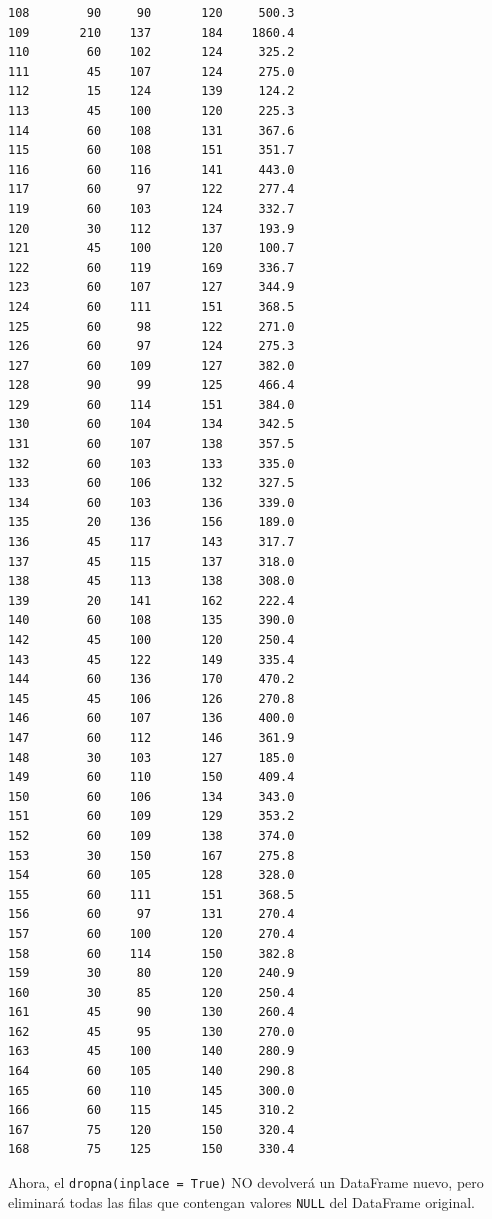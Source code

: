 \begin{code}
\begin{verbatim}
108        90     90       120     500.3
109       210    137       184    1860.4
110        60    102       124     325.2
111        45    107       124     275.0
112        15    124       139     124.2
113        45    100       120     225.3
114        60    108       131     367.6
115        60    108       151     351.7
116        60    116       141     443.0
117        60     97       122     277.4
119        60    103       124     332.7
120        30    112       137     193.9
121        45    100       120     100.7
122        60    119       169     336.7
123        60    107       127     344.9
124        60    111       151     368.5
125        60     98       122     271.0
126        60     97       124     275.3
127        60    109       127     382.0
128        90     99       125     466.4
129        60    114       151     384.0
130        60    104       134     342.5
131        60    107       138     357.5
132        60    103       133     335.0
133        60    106       132     327.5
134        60    103       136     339.0
135        20    136       156     189.0
136        45    117       143     317.7
137        45    115       137     318.0
138        45    113       138     308.0
139        20    141       162     222.4
140        60    108       135     390.0
142        45    100       120     250.4
143        45    122       149     335.4
144        60    136       170     470.2
145        45    106       126     270.8
146        60    107       136     400.0
147        60    112       146     361.9
148        30    103       127     185.0
149        60    110       150     409.4
150        60    106       134     343.0
151        60    109       129     353.2
152        60    109       138     374.0
153        30    150       167     275.8
154        60    105       128     328.0
155        60    111       151     368.5
156        60     97       131     270.4
157        60    100       120     270.4
158        60    114       150     382.8
159        30     80       120     240.9
160        30     85       120     250.4
161        45     90       130     260.4
162        45     95       130     270.0
163        45    100       140     280.9
164        60    105       140     290.8
165        60    110       145     300.0
166        60    115       145     310.2
167        75    120       150     320.4
168        75    125       150     330.4
\end{verbatim}
\end{code}

Ahora, el \texttt{dropna(inplace\ =\ True)} NO devolverá un DataFrame
nuevo, pero eliminará todas las filas que contengan valores
\texttt{NULL} del DataFrame original.

